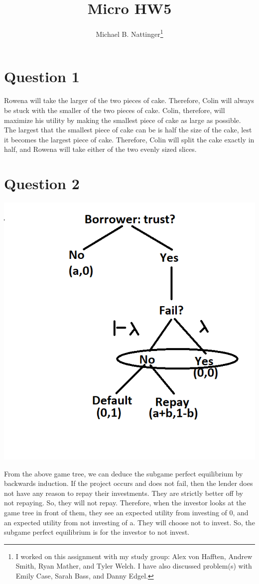 \documentclass[11pt]{article} %
\title{Micro HW5}
\author{Michael B. Nattinger\footnote{I worked on this assignment with my study group: Alex von Hafften, Andrew Smith, Ryan Mather, and Tyler Welch. I have also discussed problem(s) with Emily Case, Sarah Bass, and Danny Edgel.}}
\begin{document}
\maketitle

\section{Question 1}
Rowena will take the larger of the two pieces of cake. Therefore, Colin will always be stuck with the smaller of the two pieces of cake. Colin, therefore, will maximize his utility by making the smallest piece of cake as large as possible. The largest that the smallest piece of cake can be is half the size of the cake, lest it becomes the largest piece of cake. Therefore, Colin will split the cake exactly in half, and Rowena will take either of the two evenly sized slices.

\section{Question 2}
\includegraphics{extform}

From the above game tree, we can deduce the subgame perfect equilibrium by backwards induction. If the project occurs and does not fail, then the lender does not have any reason to repay their investments. They are strictly better off by not repaying. So, they will not repay. Therefore, when the investor looks at the game tree in front of them, they see an expected utility from investing of 0, and an expected utility from not investing of a. They will choose not to invest. So, the subgame perfect equilibrium is for the investor to not invest.
\end{document}
